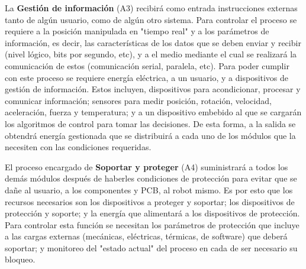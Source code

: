 La \textbf{Gesti\'on de informaci\'on} (A3) recibir\'a como entrada instrucciones externas tanto de alg\'un usuario, como de alg\'un otro sistema. Para controlar el proceso se requiere a la posici\'on manipulada en "tiempo real" y a los par\'ametros de informaci\'on, es decir, las caracter\'isticas de los datos que se deben enviar y recibir (nivel l\'ogico, bits por segundo, etc), y a el medio mediante el cual se realizar\'a la comunicaci\'on de estos (comunicaci\'on serial, paralela, etc). Para poder cumplir con este proceso se requiere energ\'ia el\'ectrica, a un usuario, y a dispositivos de gesti\'on de informaci\'on. Estos incluyen, dispositivos  para acondicionar, procesar y comunicar informaci\'on; sensores para medir posici\'on, rotaci\'on, velocidad, aceleraci\'on, fuerza y temperatura; y a un dispositivo embebido al que se cargar\'an los algoritmos de control para tomar las decisiones. De esta forma, a la salida se obtendr\'a energ\'ia gestionada que se distribuir\'a a cada uno de los m\'odulos que la necesiten con las condiciones requeridas.

El proceso encargado de \textbf{Soportar y proteger} (A4) suministrar\'a a todos los dem\'as m\'odulos despu\'es de haberles condiciones de protecci\'on para evitar que se da\~{n}e al usuario, a los componentes y PCB, al robot mismo. Es por esto que los recursos necesarios son los dispositivos a proteger y soportar; los dispositivos de protecci\'on y soporte; y la energ\'ia que alimentar\'a a los dispositivos de protecci\'on. Para controlar esta funci\'on se necesitan los par\'ametros de protecci\'on que incluye a las cargas externas (mec\'anicas, el\'ectricas, t\'ermicas, de software) que deber\'a soportar; y monitoreo del "estado actual" del proceso en cada de ser necesario su bloqueo.

